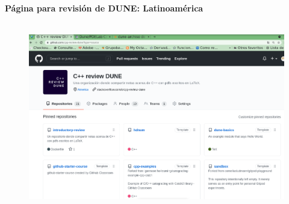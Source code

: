 {
\begin{frame}[plain]
\end{frame}
}

\begin{frame}
	\frametitle{\secname}
	\framesubtitle{Página para revisión de DUNE: Latinoamérica}
	\begin{figure}[ht!]
		\centering
		\includegraphics[height=8cm, width=12cm]{cpp_review}
	\end{figure}

\end{frame}




